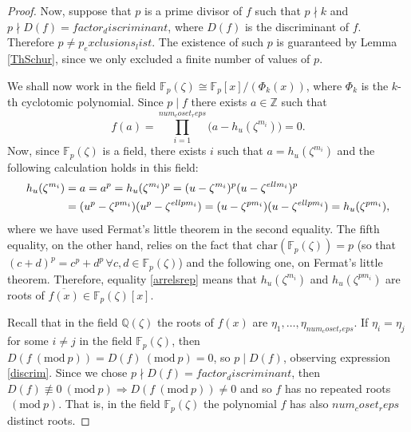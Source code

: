 \documentclass[a4paper, 12pt]{article}
\theoremstyle{definition}
\theoremstyle{remark}
\newcommand{\Z}{\ensuremath{\mathbb{Z}}}
\newcommand{\Q}{\ensuremath{\mathbb{Q}}}
\newcommand{\F}{\ensuremath{\mathbb{F}}}
\newcommand{\Mod}[1]{\ (\mathrm{mod}\ #1)} %
\begin{document}
\begin{proof}
Now, suppose that $p$ is a prime divisor of $f$ such that $p\nmid {k}$ and $p\nmid D(f)={factor_discriminant}$, where $D(f)$ is the discriminant of $f$. Therefore $p\neq{p_exclusions_list}$. The existence of such $p$ is guaranteed by Lemma \ref{ThSchur}, since we only excluded a finite number of values of $p$.

We shall now work in the field $\F_p(\zeta)\cong\F_p[x]/(\Phi_{{k}}(x))$, where $\Phi_{{k}}$ is the ${k}$-th cyclotomic polynomial. Since $p\mid f$ there exists $a\in\Z$ such that 
\begin{equation*}
f(a)=\prod_{i=1}^{{num_coset_reps}}\big(a-h_{{u}}(\zeta^{m_i})\big)=0.
\end{equation*}
Now, since $\F_p(\zeta)$ is a field, there exists $i$ such that $a=h_{{u}}(\zeta^{m_i})$ and the following calculation holds in this field:
\begin{align}\label{arrelsrep}
h_{{u}}(\zeta^{m_i})&=a=a^p=h_{{u}}(\zeta^{m_i})^p=({u}-\zeta^{m_i})^p({u}-\zeta^{{ell}m_i})^p\notag \\
&=({u}^p-\zeta^{pm_i})({u}^p-\zeta^{{ell}pm_i})=({u}-\zeta^{pm_i})({u}-\zeta^{{ell}pm_i})=h_{{u}}(\zeta^{pm_i}),
\end{align}
where we have used Fermat's little theorem in the second equality. The fifth equality, on the other hand, relies on the fact that $\text{char}(\F_p(\zeta))=p$ (so that $(c+d)^p=c^p+d^p \, \forall c,d \in \F_p(\zeta)$) and the following one, on Fermat's little theorem. Therefore, equality \eqref{arrelsrep} means that $h_{{u}}(\zeta^{m_i})$ and $h_{{u}}(\zeta^{pm_i})$ are roots of $\overline{f(x)}\in\F_p(\zeta)[x]$. 

Recall that in the field $\Q(\zeta)$ the roots of $f(x)$ are $\eta_1,\dots,\eta_{{num_coset_reps}}$. If $\eta_i=\eta_j$ for some $i\neq j$ in the field $\F_p(\zeta)$, then $D(f \Mod{p})=D(f) \Mod{p}=0$, so $p\mid D(f)$, observing expression \eqref{discrim}. Since we chose $p\nmid D(f)={factor_discriminant}$, then $D(f)\not\equiv 0 \Mod{p} \Rightarrow D(f \Mod{p})\neq 0$ and so $f$ has no repeated roots$\Mod{{p}}$. That is, in the field $\F_p(\zeta)$ the polynomial $f$ has also ${num_coset_reps}$ distinct roots.


\end{proof}
\end{document}
